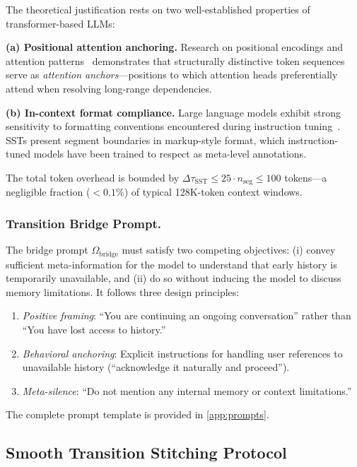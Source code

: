 \documentclass[10pt,twocolumn]{article}
\newcommand{\Dtok}{\tau}
\begin{document}
The theoretical justification rests on two well-established properties of transformer-based LLMs:

\textbf{(a) Positional attention anchoring.} Research on positional encodings and attention patterns~\cite{press2022train, su2024roformer} demonstrates that structurally distinctive token sequences serve as \emph{attention anchors}---positions to which attention heads preferentially attend when resolving long-range dependencies.

\textbf{(b) In-context format compliance.} Large language models exhibit strong sensitivity to formatting conventions encountered during instruction tuning~\cite{wei2022finetuned, ouyang2022training}. SSTs present segment boundaries in markup-style format, which instruction-tuned models have been trained to respect as meta-level annotations.

The total token overhead is bounded by $\Delta\Dtok_{\mathrm{SST}} \leq 25 \cdot n_{\mathrm{seg}} \leq 100$ tokens---a negligible fraction ($< 0.1\%$) of typical 128K-token context windows.

\subsubsection{Transition Bridge Prompt.}\label{sec:bridge}

The bridge prompt $\Omega_{\mathrm{bridge}}$ must satisfy two competing objectives: (i) convey sufficient meta-information for the model to understand that early history is temporarily unavailable, and (ii) do so without inducing the model to discuss memory limitations. It follows three design principles:
\begin{enumerate}
  \item \emph{Positive framing}: ``You are continuing an ongoing conversation'' rather than ``You have lost access to history.''
  \item \emph{Behavioral anchoring}: Explicit instructions for handling user references to unavailable history (``acknowledge it naturally and proceed'').
  \item \emph{Meta-silence}: ``Do not mention any internal memory or context limitations.''
\end{enumerate}

The complete prompt template is provided in \cref{app:prompts}.

\subsection{Smooth Transition Stitching Protocol}\label{sec:stsp}
\end{document}
